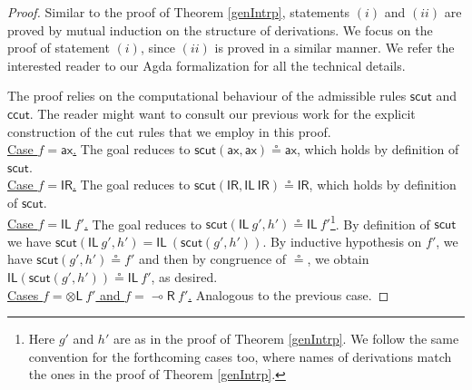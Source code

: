 \documentclass[sn-mathphys-num]{sn-jnl}%
\newcommand{\vd}{\vdash}
\newcommand{\tl}{\otimes \mathsf{L}}
\newcommand{\unitl}{\mathsf{IL}}
\newcommand{\unitr}{\mathsf{IR}}
\newcommand{\ax}{\mathsf{ax}}
\newcommand{\lolli}{\multimap}
\newcommand{\lright}{{\lolli}\mathsf{R}}
\newcommand{\mf}[1]{\mathsf{#1}}
\newcommand{\scut}[2]{\mf{scut} (#1 , #2)}
\theoremstyle{thmstyleone}%
\theoremstyle{thmstyletwo}%
\theoremstyle{thmstylethree}%
\begin{document}
\cutIntrp
\begin{proof}
  Similar to the proof of Theorem \ref{genIntrp}, statements $(i)$ and $(ii)$ are proved by mutual induction on the structure of derivations.
  We focus on the proof of statement $(i)$, since $(ii)$ is proved in a similar manner. We refer the interested reader to our Agda formalization for all the technical details.

  The proof relies on the computational behaviour of the admissible rules $\mf{scut}$ and $\mf{ccut}$. The reader might want to consult our previous work \cite{uustalu:sequent:2021,wan2024} for the explicit construction of the cut rules that we employ in this proof. \\
  \underline{Case $f = \ax$.} The goal reduces to $\mf{scut} (\ax , \ax) \circeq \ax$, which holds by definition of $\mf{scut}$.
  \\
  \underline{Case $f = \unitr$.} The goal reduces to $\mf{scut} (\unitr , \unitl\  \unitr) \circeq \unitr$, which holds by definition of $\mf{scut}$. %
  \\
  \underline{Case $f = \unitl \ f'$.} The goal reduces to $\mf{scut} (\unitl \ g', h') \circeq \unitl\ f'$\footnote{Here $g'$ and $h'$ are as in the proof of Theorem \ref{genIntrp}. We follow the same convention for the forthcoming cases too, where names of derivations match the ones in the proof of Theorem \ref{genIntrp}.}. By definition of $\mf{scut}$ we have $\mf{scut} (\unitl \ g', h') = \unitl\ (\mf{scut} (g', h'))$. By inductive hypothesis on $f'$, we have $\mf{scut} (g' , h') \circeq f'$ and then by congruence of $\circeq$, we obtain $\unitl (\scut{g'}{h'}) \circeq \unitl\ f'$, as desired.
  \\
  \underline{Cases $f = \tl \ f'$ and $f = \lright \ f'$.} Analogous to the previous case.

\end{proof}
\end{document}
